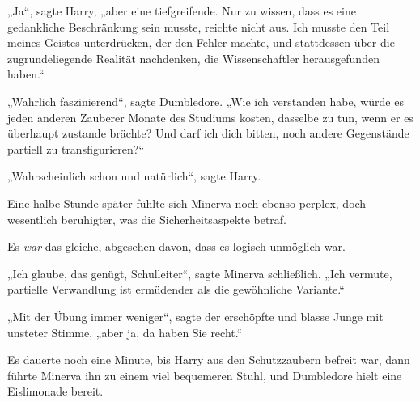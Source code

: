 „Ja“, sagte Harry, „aber eine tiefgreifende. Nur zu wissen, dass es eine gedankliche Beschränkung sein musste, reichte nicht aus. Ich musste den Teil meines Geistes unterdrücken, der den Fehler machte, und stattdessen über die zugrundeliegende Realität nachdenken, die Wissenschaftler herausgefunden haben.“

„Wahrlich faszinierend“, sagte Dumbledore.
„Wie ich verstanden habe, würde es jeden anderen Zauberer Monate des Studiums kosten, dasselbe zu tun, wenn er es überhaupt zustande brächte? Und darf ich dich bitten, noch andere Gegenstände partiell zu transfigurieren?“

„Wahrscheinlich schon und natürlich“, sagte Harry.

Eine halbe Stunde später fühlte sich Minerva noch ebenso perplex, doch wesentlich beruhigter, was die Sicherheitsaspekte betraf.

Es \emph{war} das gleiche, abgesehen davon, dass es logisch unmöglich war.

„Ich glaube, das genügt, Schulleiter“, sagte Minerva schließlich.
„Ich vermute, partielle Verwandlung ist ermüdender als die gewöhnliche Variante.“

„Mit der Übung immer weniger“, sagte der erschöpfte und blasse Junge mit unsteter Stimme, „aber ja, da haben Sie recht.“

Es dauerte noch eine Minute, bis Harry aus den Schutzzaubern befreit war, dann führte Minerva ihn zu einem viel bequemeren Stuhl, und Dumbledore hielt eine Eislimonade bereit.

